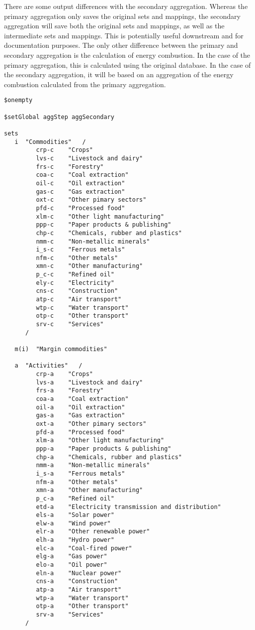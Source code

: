 There are some output differences with the secondary aggregation.
Whereas the primary aggregation only saves the original sets and mappings,
the secondary aggregation will save both the original sets and mappings,
as well as the intermediate sets and mappings. This is potentially useful
downstream and for documentation purposes. The only other difference
between the primary and secondary aggregation is the calculation
of energy combustion. In the case of the primary aggregation, this
is calculated using the original database. In the case of the
secondary aggregation, it will be based on an aggregation
of the energy combustion calculated from the primary aggregation.

\begin{lstlisting}[language=GAMS, caption={Map file example for the secondary aggregation}, label=lst:Agg2]
$onempty

$setGlobal aggStep aggSecondary

sets
   i  "Commodities"   /
         crp-c    "Crops"
         lvs-c    "Livestock and dairy"
         frs-c    "Forestry"
         coa-c    "Coal extraction"
         oil-c    "Oil extraction"
         gas-c    "Gas extraction"
         oxt-c    "Other pimary sectors"
         pfd-c    "Processed food"
         xlm-c    "Other light manufacturing"
         ppp-c    "Paper products & publishing"
         chp-c    "Chemicals, rubber and plastics"
         nmm-c    "Non-metallic minerals"
         i_s-c    "Ferrous metals"
         nfm-c    "Other metals"
         xmn-c    "Other manufacturing"
         p_c-c    "Refined oil"
         ely-c    "Electricity"
         cns-c    "Construction"
         atp-c    "Air transport"
         wtp-c    "Water transport"
         otp-c    "Other transport"
         srv-c    "Services"
      /

   m(i)  "Margin commodities"

   a  "Activities"   /
         crp-a    "Crops"
         lvs-a    "Livestock and dairy"
         frs-a    "Forestry"
         coa-a    "Coal extraction"
         oil-a    "Oil extraction"
         gas-a    "Gas extraction"
         oxt-a    "Other pimary sectors"
         pfd-a    "Processed food"
         xlm-a    "Other light manufacturing"
         ppp-a    "Paper products & publishing"
         chp-a    "Chemicals, rubber and plastics"
         nmm-a    "Non-metallic minerals"
         i_s-a    "Ferrous metals"
         nfm-a    "Other metals"
         xmn-a    "Other manufacturing"
         p_c-a    "Refined oil"
         etd-a    "Electricity transmission and distribution"
         els-a    "Solar power"
         elw-a    "Wind power"
         elr-a    "Other renewable power"
         elh-a    "Hydro power"
         elc-a    "Coal-fired power"
         elg-a    "Gas power"
         elo-a    "Oil power"
         eln-a    "Nuclear power"
         cns-a    "Construction"
         atp-a    "Air transport"
         wtp-a    "Water transport"
         otp-a    "Other transport"
         srv-a    "Services"
      /


\end{lstlisting}
